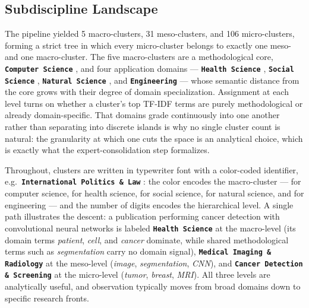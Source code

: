 \documentclass{article}
\begin{document}
	\subsection{Subdiscipline Landscape}
	\label{subdiscipline_landscape}
	
	The pipeline yielded 5 macro-clusters, 31 meso-clusters, and 106 micro-clusters, forming a strict tree in which every micro-cluster belongs to exactly one meso- and one macro-cluster. The five macro-clusters are a methodological core, \textbf{\texttt{Computer Science}} , and four application domains --- \textbf{\texttt{Health Science}} , \textbf{\texttt{Social Science}} , \textbf{\texttt{Natural Science}} , and \textbf{\texttt{Engineering}}  --- whose semantic distance from the core grows with their degree of domain specialization. Assignment at each level turns on whether a cluster's top TF-IDF terms are purely methodological or already domain-specific. That domains grade continuously into one another rather than separating into discrete islands is why no single cluster count is natural: the granularity at which one cuts the space is an analytical choice, which is exactly what the expert-consolidation step formalizes.
	
	Throughout, clusters are written in typewriter font with a color-coded identifier, e.g.\ \textbf{\texttt{International Politics \& Law}} : the color encodes the macro-cluster ---  for computer science,  for health science,  for social science,  for natural science, and  for engineering --- and the number of digits encodes the hierarchical level. A single path illustrates the descent: a publication performing cancer detection with convolutional neural networks is labeled \textbf{\texttt{Health Science}}  at the macro-level (its domain terms \textit{patient}, \textit{cell}, and \textit{cancer} dominate, while shared methodological terms such as \textit{segmentation} carry no domain signal), \textbf{\texttt{Medical Imaging \& Radiology}}  at the meso-level (\textit{image}, \textit{segmentation}, \textit{CNN}), and \textbf{\texttt{Cancer Detection \& Screening}}  at the micro-level (\textit{tumor}, \textit{breast}, \textit{MRI}). All three levels are analytically useful, and observation typically moves from broad domains down to specific research fronts.
	
\end{document}

